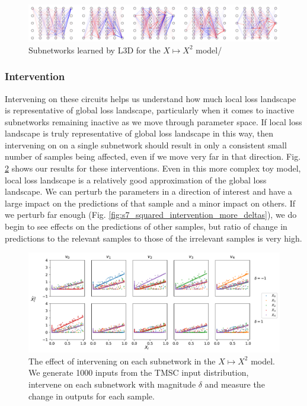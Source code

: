 \documentclass{article}
\theoremstyle{plain}
\theoremstyle{definition}
\theoremstyle{remark}
\begin{document}
\begin{figure}[htbp]
    \centerline{\includegraphics[width=\textwidth]{../figures/8_squared_subnetworks.pdf}}
    \centering
    \caption{Subnetworks learned by L3D for the $X \mapsto X^2$ model/}\label{fig:8_squared_subnetworks}
\end{figure}



\subsubsection{Intervention}

Intervening on these circuits helps us understand how much local loss landscape is representative of global loss landscape, particularly when it comes to inactive subnetworks remaining inactive as we move through parameter space. If local loss landscape is truly representative of global loss landscape in this way, then intervening on on a single subnetwork should result in only a consistent small number of samples being affected, even if we move very far in that direction. Fig. \ref{fig:9_squared_intervention} shows our results for these interventions. Even in this more complex toy model, local loss landscape is a relatively good approximation of the global loss landscape. We can perturb the parameters in a direction of interest and have a large impact on the predictions of that sample and a minor impact on others. If we perturb far enough (Fig. \ref{fig:s7_squared_intervention_more_deltas}), we do begin to see effects on the predictions of other samples, but ratio of change in predictions to the relevant samples to those of the irrelevant samples is very high.



\begin{figure}[htbp]
    \centerline{\includegraphics[width=\textwidth]{../figures/9_squared_intervention.pdf}}
    \centering
    \caption{The effect of intervening on each subnetwork in the $X \mapsto X^2$ model. We generate 1000 inputs from the TMSC input distribution, intervene on each subnetwork with magnitude $\delta$ and measure the change in outputs for each sample.}\label{fig:9_squared_intervention}
\end{figure}
\end{document}
